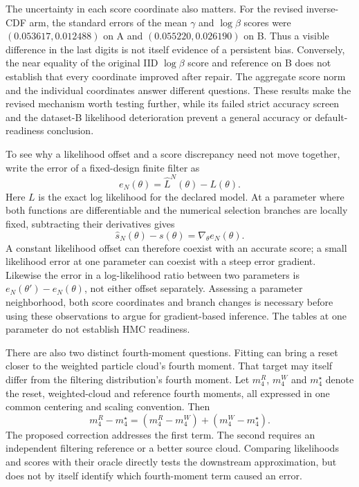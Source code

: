 The uncertainty in each score coordinate also matters.  For the revised
inverse-CDF arm, the standard errors of the mean \(\gamma\) and
\(\log\beta\) scores were \((0.053617,0.012488)\) on A and
\((0.055220,0.026190)\) on B.  Thus a visible difference in the last digits is
not itself evidence of a persistent bias.  Conversely, the near equality of
the original IID \(\log\beta\) score and reference on B does not establish
that every coordinate improved after repair.  The aggregate score norm and
the individual coordinates answer different questions.  These results make
the revised mechanism worth testing further, while its failed strict accuracy
screen and the dataset-B likelihood deterioration prevent a general accuracy
or default-readiness conclusion.

To see why a likelihood offset and a score discrepancy need not move together,
write the error of a fixed-design finite filter as
\begin{equation}
 e_N(\theta)=\widehat L^N(\theta)-L(\theta).
 \label{eq:bf-eot-hm-likelihood-error}
\end{equation}
Here \(L\) is the exact log likelihood for the declared model.  At a parameter
where both functions are differentiable and the numerical selection branches
are locally fixed, subtracting their derivatives gives
\begin{equation}
 \widehat s_N(\theta)-s(\theta)=\nabla_\theta e_N(\theta).
 \label{eq:bf-eot-hm-score-error}
\end{equation}
A constant likelihood offset can therefore coexist with an accurate score;
a small likelihood error at one parameter can coexist with a steep error
gradient.  Likewise the error in a log-likelihood ratio between two parameters
is \(e_N(\theta')-e_N(\theta)\), not either offset separately.  Assessing a
parameter neighborhood, both score coordinates and branch changes is
necessary before using these observations to argue for gradient-based
inference.  The tables at one parameter do not establish HMC readiness.

There are also two distinct fourth-moment questions.  Fitting can bring a reset
closer to the weighted particle cloud's fourth moment.  That target may itself
differ from the filtering distribution's fourth moment.  Let \(m_4^{R}\),
\(m_4^{W}\) and \(m_4^\star\) denote the reset, weighted-cloud and reference
fourth moments, all expressed in one common centering and scaling convention.
Then
\[
 m_4^{R}-m_4^\star
   =(m_4^{R}-m_4^{W})+(m_4^{W}-m_4^\star).
\]
The proposed correction addresses the first term.  The second requires an
independent filtering reference or a better source cloud.  Comparing likelihoods
and scores with their oracle directly tests the downstream approximation, but
does not by itself identify which fourth-moment term caused an error.

